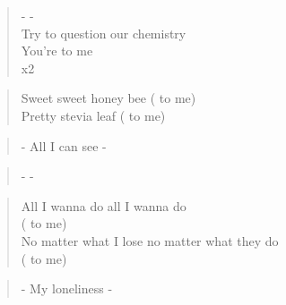 \begin{verse}
-  - \\
Try to question our chemistry \\
You're  to me\\
x2
\end{verse}

\begin{verse}
Sweet sweet honey bee ( to me)\\
Pretty stevia leaf ( to me)
\end{verse}

\begin{verse}
- All I can see -
\end{verse}

\begin{verse}
-  -
\end{verse}

\begin{verse}
All I wanna do all I wanna do \\
( to me)\\
No matter what I lose no matter what they do \\
( to me)
\end{verse}

\begin{verse}
- My loneliness -
\end{verse}

\clearpage
